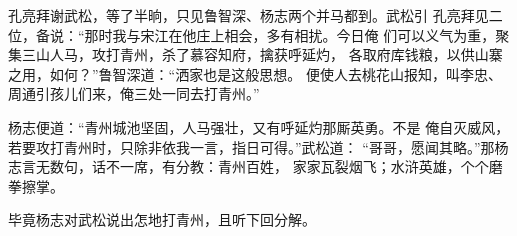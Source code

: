 孔亮拜谢武松，等了半晌，只见鲁智深、杨志两个并马都到。武松引
孔亮拜见二位，备说：“那时我与宋江在他庄上相会，多有相扰。今日俺
们可以义气为重，聚集三山人马，攻打青州，杀了慕容知府，擒获呼延灼，
各取府库钱粮，以供山寨之用，如何？”鲁智深道：“洒家也是这般思想。
便使人去桃花山报知，叫李忠、周通引孩儿们来，俺三处一同去打青州。”

杨志便道：“青州城池坚固，人马强壮，又有呼延灼那厮英勇。不是
俺自灭威风，若要攻打青州时，只除非依我一言，指日可得。”武松道：
“哥哥，愿闻其略。”那杨志言无数句，话不一席，有分教：青州百姓，
家家瓦裂烟飞；水浒英雄，个个磨拳擦掌。

毕竟杨志对武松说出怎地打青州，且听下回分解。